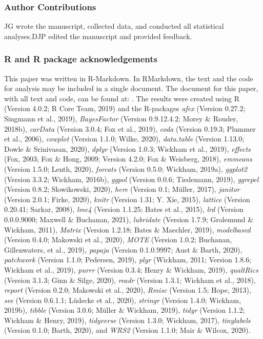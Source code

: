 \documentclass[
  english,
  jou]{apa7}
\begin{document}
\hypertarget{author-contributions}{%
\subsubsection{Author Contributions}\label{author-contributions}}

JG wrote the manuscript, collected data, and conducted all statistical analyses.DJP edited the manuscript and provided feedback.
\newline

\hypertarget{r-and-r-package-acknowledgements}{%
\subsubsection{R and R package acknowledgements}\label{r-and-r-package-acknowledgements}}

This paper was written in R-Markdown. In RMarkdown, the text and the code for analysis may
be included in a single document. The document for this paper, with all text and code, can be found at: . The results were created using R (Version 4.0.2; R Core Team, 2019) and the R-packages \emph{afex} (Version 0.27.2; Singmann et al., 2019), \emph{BayesFactor} (Version 0.9.12.4.2; Morey \& Rouder, 2018b), \emph{carData} (Version 3.0.4; Fox et al., 2019), \emph{coda} (Version 0.19.3; Plummer et al., 2006), \emph{cowplot} (Version 1.1.0; Wilke, 2020), \emph{data.table} (Version 1.13.0; Dowle \& Srinivasan, 2020), \emph{dplyr} (Version 1.0.3; Wickham et al., 2019), \emph{effects} (Fox, 2003; Fox \& Hong, 2009; Version 4.2.0; Fox \& Weisberg, 2018), \emph{emmeans} (Version 1.5.0; Lenth, 2020), \emph{forcats} (Version 0.5.0; Wickham, 2019a), \emph{ggplot2} (Version 3.3.2; Wickham, 2016b), \emph{ggpol} (Version 0.0.6; Tiedemann, 2019), \emph{ggrepel} (Version 0.8.2; Slowikowski, 2020), \emph{here} (Version 0.1; Müller, 2017), \emph{janitor} (Version 2.0.1; Firke, 2020), \emph{knitr} (Version 1.31; Y. Xie, 2015), \emph{lattice} (Version 0.20.41; Sarkar, 2008), \emph{lme4} (Version 1.1.25; Bates et al., 2015), \emph{lrd} (Version 0.0.0.9000; Maxwell \& Buchanan, 2021), \emph{lubridate} (Version 1.7.9; Grolemund \& Wickham, 2011), \emph{Matrix} (Version 1.2.18; Bates \& Maechler, 2019), \emph{modelbased} (Version 0.4.0; Makowski et al., 2020), \emph{MOTE} (Version 1.0.2; Buchanan, Gillenwaters, et al., 2019), \emph{papaja} (Version 0.1.0.9997; Aust \& Barth, 2020), \emph{patchwork} (Version 1.1.0; Pedersen, 2019), \emph{plyr} (Wickham, 2011; Version 1.8.6; Wickham et al., 2019), \emph{purrr} (Version 0.3.4; Henry \& Wickham, 2019), \emph{qualtRics} (Version 3.1.3; Ginn \& Silge, 2020), \emph{readr} (Version 1.3.1; Wickham et al., 2018), \emph{report} (Version 0.2.0; Makowski et al., 2020), \emph{Rmisc} (Version 1.5; Hope, 2013), \emph{see} (Version 0.6.1.1; Lüdecke et al., 2020), \emph{stringr} (Version 1.4.0; Wickham, 2019b), \emph{tibble} (Version 3.0.6; Müller \& Wickham, 2019), \emph{tidyr} (Version 1.1.2; Wickham \& Henry, 2019), \emph{tidyverse} (Version 1.3.0; Wickham, 2017), \emph{tinylabels} (Version 0.1.0; Barth, 2020), and \emph{WRS2} (Version 1.1.0; Mair \& Wilcox, 2020).
\end{document}
